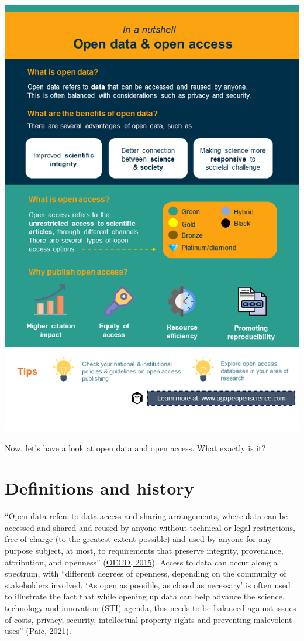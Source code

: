 \documentclass[
]{book}
\begin{document}
\includegraphics{images/slide2.png}

Now, let's have a look at open data and open access. What exactly is it?

\hypertarget{definitions-and-history}{%
\section{Definitions and history}\label{definitions-and-history}}

``Open data refers to data access and sharing arrangements, where data can be accessed and shared and reused by anyone without technical or legal restrictions, free of charge (to the greatest extent possible) and used by anyone for any purpose subject, at most, to requirements that preserve integrity, provenance, attribution, and openness'' (\href{https://www.oecd-ilibrary.org/science-and-technology/making-open-science-a-reality_5jrs2f963zs1-en}{OECD, 2015}). Access to data can occur along a spectrum, with ``different degrees of openness, depending on the community of stakeholders involved. `As open as possible, as closed as necessary' is often used to illustrate the fact that while opening up data can help advance the science, technology and innovation (STI) agenda, this needs to be balanced against issues of costs, privacy, security, intellectual property rights and preventing malevolent uses'' (\href{https://goingdigital.oecd.org/data/notes/No13_ToolkitNote_OpenScience.pdf}{Paic, 2021}).
\end{document}
